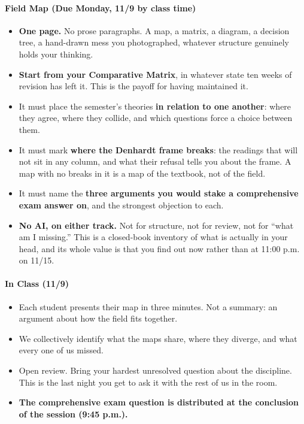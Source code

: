 \documentclass[11pt]{article}     %
\begin{document}
\paragraph*{Field Map (Due Monday, 11/9 by class time)}
\begin{itemize}
    \item \textbf{One page.} No prose paragraphs. A map, a matrix, a diagram, a decision tree, a hand-drawn mess you photographed, whatever structure genuinely holds your thinking.
    \item \textbf{Start from your Comparative Matrix}, in whatever state ten weeks of revision has left it. This is the payoff for having maintained it.
    \item It must place the semester's theories \textbf{in relation to one another}: where they agree, where they collide, and which questions force a choice between them.
    \item It must mark \textbf{where the Denhardt frame breaks}: the readings that will not sit in any column, and what their refusal tells you about the frame. A map with no breaks in it is a map of the textbook, not of the field.
    \item It must name the \textbf{three arguments you would stake a comprehensive exam answer on}, and the strongest objection to each.
    \item \textbf{No AI, on either track.} Not for structure, not for review, not for ``what am I missing.'' This is a closed-book inventory of what is actually in your head, and its whole value is that you find out now rather than at 11:00 p.m. on 11/15.
\end{itemize}

\paragraph*{In Class (11/9)}
\begin{itemize}
    \item Each student presents their map in three minutes. Not a summary: an argument about how the field fits together.
    \item We collectively identify what the maps share, where they diverge, and what every one of us missed.
    \item Open review. Bring your hardest unresolved question about the discipline. This is the last night you get to ask it with the rest of us in the room.
    \item \textbf{The comprehensive exam question is distributed at the conclusion of the session (9:45 p.m.).}
\end{itemize}
\end{document}
